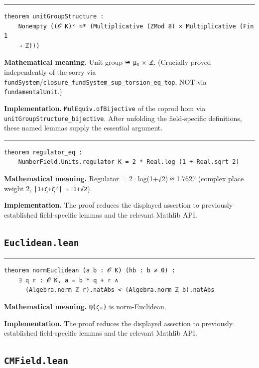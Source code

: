\documentclass[UTF8,a4paper,11pt,fontset=fandol]{ctexart}
\theoremstyle{definition}
\newcommand{\statementsep}{\par\medskip\hrule\medskip}
\begin{document}
\statementsep
\begin{verbatim}
theorem unitGroupStructure :
    Nonempty ((𝓞 K)ˣ ≃* (Multiplicative (ZMod 8) × Multiplicative (Fin 1
    → ℤ)))
\end{verbatim}
\noindent\textbf{Mathematical meaning.} Unit group ≅ μ₈ × ℤ. (Crucially proved independently of the sorry via \texttt{fundSystem}/\texttt{closure\_\allowbreak{}fundSystem\_\allowbreak{}sup\_\allowbreak{}torsion\_\allowbreak{}eq\_\allowbreak{}top}, NOT via \texttt{fundamentalUnit}.)\par
\noindent\textbf{Implementation.} \texttt{MulEquiv.\allowbreak{}ofBijective} of the coprod hom via \texttt{unitGroupStructure\_\allowbreak{}bijective}. After unfolding the field-specific definitions, these named lemmas supply the essential argument.\par
\statementsep
\begin{verbatim}
theorem regulator_eq :
    NumberField.Units.regulator K = 2 * Real.log (1 + Real.sqrt 2)
\end{verbatim}
\noindent\textbf{Mathematical meaning.} Regulator = 2·log(1+√2) ≈ 1.7627 (complex place weight 2, \texttt{|1+ζ+ζ⁷| = 1+√2}).\par
\noindent\textbf{Implementation.} The proof reduces the displayed assertion to previously established field-specific lemmas and the relevant Mathlib API.\par

\subsection{\texttt{Euclidean.lean}}

\statementsep
\begin{verbatim}
theorem normEuclidean (a b : 𝓞 K) (hb : b ≠ 0) :
    ∃ q r : 𝓞 K, a = b * q + r ∧
      (Algebra.norm ℤ r).natAbs < (Algebra.norm ℤ b).natAbs
\end{verbatim}
\noindent\textbf{Mathematical meaning.} \texttt{ℚ(ζ₈)} is norm-Euclidean.\par
\noindent\textbf{Implementation.} The proof reduces the displayed assertion to previously established field-specific lemmas and the relevant Mathlib API.\par

\subsection{\texttt{CMField.lean}}
\end{document}
